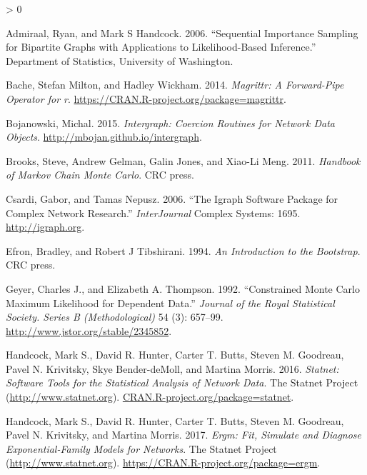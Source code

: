 \documentclass[
]{book}
\newlength{\cslhangindent}
\newenvironment{CSLReferences}[2] %
 {%
  \setlength{\parindent}{0pt}
  \ifodd #1 \everypar{\setlength{\hangindent}{\cslhangindent}}\ignorespaces\fi
  \ifnum #2 > 0
  \setlength{\parskip}{#2\baselineskip}
  \fi
 }%
 {}
\begin{document}
\hypertarget{refs}{}
\begin{CSLReferences}{1}{0}
\leavevmode\hypertarget{ref-admiraal2006}{}%
Admiraal, Ryan, and Mark S Handcock. 2006. {``Sequential Importance Sampling for Bipartite Graphs with Applications to Likelihood-Based Inference.''} Department of Statistics, University of Washington.

\leavevmode\hypertarget{ref-R-magrittr}{}%
Bache, Stefan Milton, and Hadley Wickham. 2014. \emph{Magrittr: A Forward-Pipe Operator for r}. \url{https://CRAN.R-project.org/package=magrittr}.

\leavevmode\hypertarget{ref-R-intergraph}{}%
Bojanowski, Michal. 2015. \emph{Intergraph: Coercion Routines for Network Data Objects}. \url{http://mbojan.github.io/intergraph}.

\leavevmode\hypertarget{ref-brooks2011}{}%
Brooks, Steve, Andrew Gelman, Galin Jones, and Xiao-Li Meng. 2011. \emph{Handbook of Markov Chain Monte Carlo}. CRC press.

\leavevmode\hypertarget{ref-R-igraph}{}%
Csardi, Gabor, and Tamas Nepusz. 2006. {``The Igraph Software Package for Complex Network Research.''} \emph{InterJournal} Complex Systems: 1695. \url{http://igraph.org}.

\leavevmode\hypertarget{ref-Efron1994}{}%
Efron, Bradley, and Robert J Tibshirani. 1994. \emph{An Introduction to the Bootstrap}. CRC press.

\leavevmode\hypertarget{ref-Geyer1992}{}%
Geyer, Charles J., and Elizabeth A. Thompson. 1992. {``Constrained Monte Carlo Maximum Likelihood for Dependent Data.''} \emph{Journal of the Royal Statistical Society. Series B (Methodological)} 54 (3): 657--99. \url{http://www.jstor.org/stable/2345852}.

\leavevmode\hypertarget{ref-R-statnet}{}%
Handcock, Mark S., David R. Hunter, Carter T. Butts, Steven M. Goodreau, Pavel N. Krivitsky, Skye Bender-deMoll, and Martina Morris. 2016. \emph{Statnet: Software Tools for the Statistical Analysis of Network Data}. The Statnet Project (\url{http://www.statnet.org}). \href{https://CRAN.R-project.org/package=statnet}{CRAN.R-project.org/package=statnet}.

\leavevmode\hypertarget{ref-R-ergm}{}%
Handcock, Mark S., David R. Hunter, Carter T. Butts, Steven M. Goodreau, Pavel N. Krivitsky, and Martina Morris. 2017. \emph{Ergm: Fit, Simulate and Diagnose Exponential-Family Models for Networks}. The Statnet Project (\url{http://www.statnet.org}). \url{https://CRAN.R-project.org/package=ergm}.


\end{CSLReferences}
\end{document}
